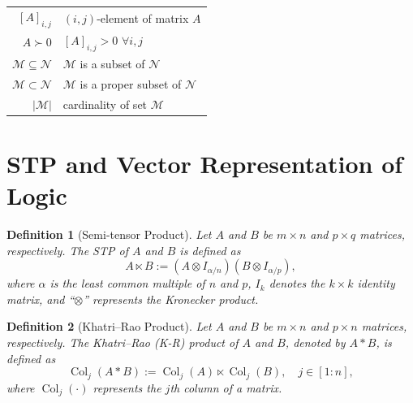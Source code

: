 \documentclass[11pt,onecolumn]{article}
\DeclareMathOperator{\col}{Col}
\newtheorem{proposition}{Proposition}
\newtheorem{definition}{Definition}
\newcommand{\ddelta}{{\boldsymbol\delta}}
\begin{document}
\begin{table}[t]
\begin{center}
\begin{tabular}{rl}
$[A]_{i,j}$ & $(i,j)$-element of matrix $A$\\
 $A\succ0$ & $[A]_{i,j}>0$ $\forall i,j$ \\
$\mathcal M\subseteq \mathcal N$  & $\mathcal M$ is a subset of $\mathcal N$\\
$\mathcal M\subset \mathcal N$ & $\mathcal M$ is a proper subset of $\mathcal N$\\
 $|\mathcal M|$ &  cardinality of set $\mathcal M$ \\
 \bottomrule
\end{tabular}
\end{center}
\label{Notations}
\end{table}


\section{STP and Vector Representation of Logic}\label{SectionSTP}



\begin{definition}[Semi-tensor Product\cite{cheng2011analysis}]\label{DefinitonSTP}
   Let $A$ and $B$ be $m\times n$ and $p\times q$ matrices, respectively. The STP of $A$ and $B$ is defined as
 \[A\ltimes B :=(A\otimes I_{\alpha/n})(B\otimes I_{\alpha/p}),\]
where $ \alpha$ is the least common multiple of $n$ and $p$, $I_k$ denotes the $k \times k$ identity matrix, and ``$\otimes$'' represents the Kronecker product.
\end{definition}





\begin{definition}[Khatri--Rao Product]
   Let $A$ and $B$ be $m\times n$ and $p\times n$ matrices, respectively. The Khatri--Rao (K-R) product of $A$ and $B$, denoted by $A*B$, is defined as
   \[\col_j(A*B):=\col_j(A)\ltimes\col_j(B),\quad j\in[1:n],\]
where $\col_j(\cdot)$ represents the $j$th column of a matrix.
   \end{definition}
\end{document}
